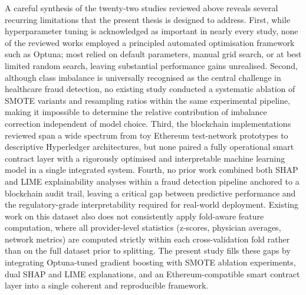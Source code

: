 A careful synthesis of the twenty-two studies reviewed above reveals several recurring limitations that the present thesis is designed to address. First, while hyperparameter tuning is acknowledged as important in nearly every study, none of the reviewed works employed a principled automated optimisation framework such as Optuna; most relied on default parameters, manual grid search, or at best limited random search, leaving substantial performance gains unrealised. Second, although class imbalance is universally recognised as the central challenge in healthcare fraud detection, no existing study conducted a systematic ablation of SMOTE variants and resampling ratios within the same experimental pipeline, making it impossible to determine the relative contribution of imbalance correction independent of model choice. Third, the blockchain implementations reviewed span a wide spectrum from toy Ethereum test-network prototypes to descriptive Hyperledger architectures, but none paired a fully operational smart contract layer with a rigorously optimised and interpretable machine learning model in a single integrated system. Fourth, no prior work combined both SHAP and LIME explainability analyses within a fraud detection pipeline anchored to a blockchain audit trail, leaving a critical gap between predictive performance and the regulatory-grade interpretability required for real-world deployment. Existing work on this dataset also does not consistently apply fold-aware feature computation, where all provider-level statistics (z-scores, physician averages, network metrics) are computed strictly within each cross-validation fold rather than on the full dataset prior to splitting. The present study fills these gaps by integrating Optuna-tuned gradient boosting with SMOTE ablation experiments, dual SHAP and LIME explanations, and an Ethereum-compatible smart contract layer into a single coherent and reproducible framework.

